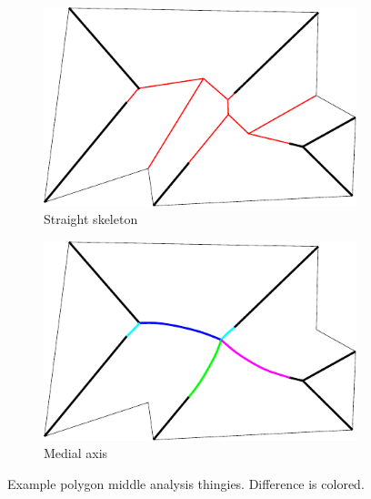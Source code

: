\begin{figure}
\begin{subfigure}{0.45\columnwidth}
\includegraphics[width=\columnwidth]{sources/method/example_straight_skeleton.pdf}
\caption{Straight skeleton}
\end{subfigure}
\begin{subfigure}{0.45\columnwidth}
\includegraphics[width=\columnwidth]{sources/method/example_medial_axis.pdf}
\caption{Medial axis}
\end{subfigure}
\caption{Example polygon middle analysis thingies. Difference is colored.}
\label{medial_axis_vs_straight_skeleton}
\end{figure}


